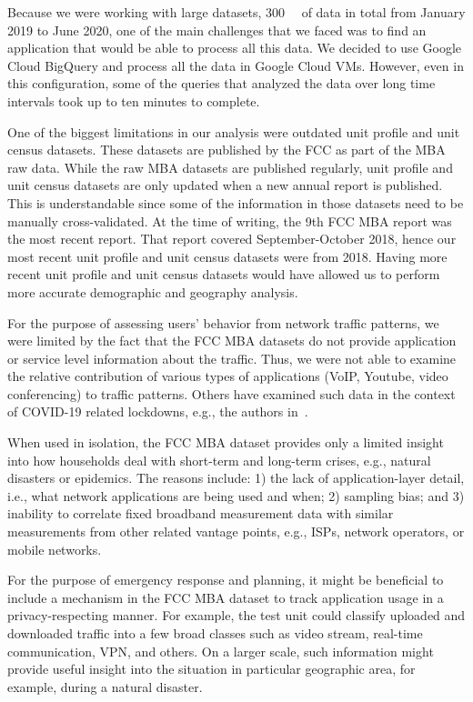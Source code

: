 \documentclass[conference,10pt]{IEEEtran}
\begin{document}
Because we were working with large datasets, \SI{300}{\giga\byte} of data in total from January 2019 to June 2020, one of the main challenges that we faced was to find an application that would be able to process all this data. We decided to use Google Cloud BigQuery and process all the data in Google Cloud \glspl{VM}. However, even in this configuration, some of the queries that analyzed the data over long time intervals took up to ten minutes to complete.

One of the biggest limitations in our analysis were outdated unit profile and unit census datasets. These datasets are published by the \gls{FCC} as part of the \gls{MBA} raw data. While the raw \gls{MBA} datasets are published regularly, unit profile and unit census datasets are only updated when a new annual report is published. This is understandable since some of the information in those datasets need to be manually cross-validated. At the time of writing, the 9th \gls{FCC} \gls{MBA} report was the most recent report. That report covered September-October 2018, hence our most recent unit profile and unit census datasets were from 2018. Having more recent unit profile and unit census datasets would have allowed us to perform more accurate demographic and geography analysis.

For the purpose of assessing users' behavior from network traffic patterns, we were limited by the fact that the \gls{FCC} \gls{MBA} datasets do not provide application or service level information about the traffic. Thus, we were not able to examine the relative contribution of various types of applications (\gls{VoIP}, Youtube, video conferencing) to traffic patterns. Others have examined such data in the context of COVID-19 related lockdowns, e.g., the authors in~\cite{bottger2020internet}.

When used in isolation, the \gls{FCC} \gls{MBA} dataset provides only a limited insight into how households deal with short-term and long-term crises, e.g., natural disasters or epidemics. The reasons include: 1) the lack of application-layer detail, i.e., what network applications are being used and when; 2) sampling bias; and 3) inability to correlate fixed broadband measurement data with similar measurements from other related vantage points, e.g., \glspl{ISP}, network operators, or mobile networks.

For the purpose of emergency response and planning, it might be beneficial to include a mechanism in the \gls{FCC} \gls{MBA} dataset to track application usage in a privacy-respecting manner. For example, the test unit could classify uploaded and downloaded traffic into a few broad classes such as video stream, real-time communication, \gls{VPN}, and others. On a larger scale, such information might provide useful insight into the situation in particular geographic area, for example, during a natural disaster.
\end{document}
